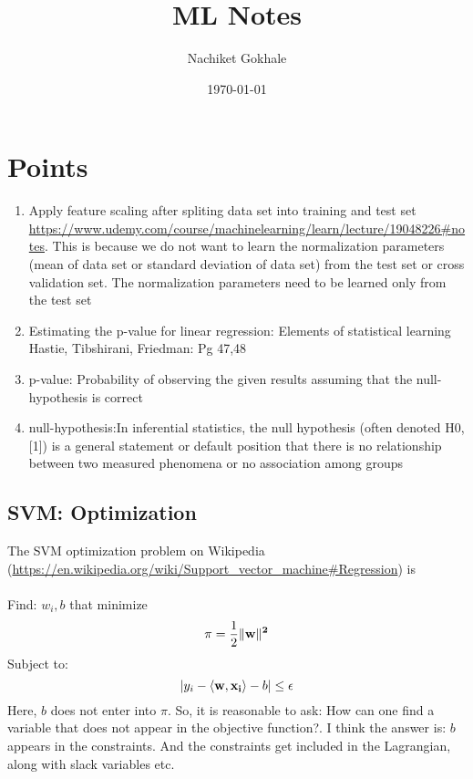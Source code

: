 \documentclass{article}
\newcommand{\beq}{\begin{equation}}
\newcommand{\eeq}{\end{equation}}
\begin{document}
\title{ML Notes}
\author{Nachiket Gokhale}
\date{\today}
\maketitle
\section{Points}
\begin{enumerate}
  \item{Apply feature scaling  after spliting data set into training and test set
    \url{https://www.udemy.com/course/machinelearning/learn/lecture/19048226#notes}. This is because we do not want to learn the normalization parameters  (mean of data set or standard deviation of data set) from the test set or cross validation set. The normalization parameters need to be learned only from the test set}
  \item{Estimating the p-value for linear regression: Elements of statistical learning Hastie, Tibshirani, Friedman: Pg 47,48}
  \item{p-value: Probability of observing the given results assuming that the null-hypothesis is correct}
  \item{null-hypothesis:In inferential statistics, the null hypothesis (often denoted H0,[1]) is a general statement or default position that there is no relationship between two measured phenomena or no association among groups}
\end{enumerate}
\subsection{SVM: Optimization}
The SVM optimization problem on Wikipedia (\url{https://en.wikipedia.org/wiki/Support_vector_machine#Regression}) is\\\\
Find: $w_i, b$ that minimize
\beq
\pi = \frac{1}{2}\|\bf{w}\|^2
\eeq
Subject to:
\beq
|y_i -  \langle {\bf{w}},{\bf{x}_i} \rangle - b | \le \epsilon
\eeq
Here, $b$ does not enter into $\pi$. So, it is reasonable to ask: How can one find a variable that does not appear in the objective function?. I think the answer is: $b$ appears in the constraints. And the constraints get included in the Lagrangian, along with slack variables etc. 
\end{document}
